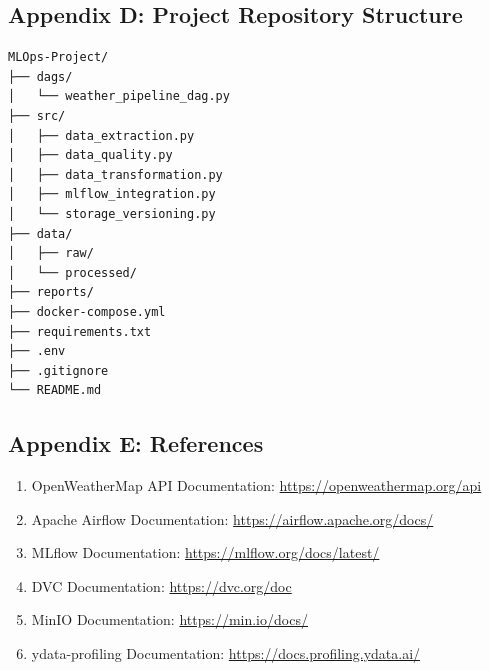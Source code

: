 \documentclass[12pt,a4paper]{article}
\begin{document}
\subsection{Appendix D: Project Repository Structure}

\begin{verbatim}
MLOps-Project/
├── dags/
│   └── weather_pipeline_dag.py
├── src/
│   ├── data_extraction.py
│   ├── data_quality.py
│   ├── data_transformation.py
│   ├── mlflow_integration.py
│   └── storage_versioning.py
├── data/
│   ├── raw/
│   └── processed/
├── reports/
├── docker-compose.yml
├── requirements.txt
├── .env
├── .gitignore
└── README.md
\end{verbatim}

\subsection{Appendix E: References}

\begin{enumerate}
    \item OpenWeatherMap API Documentation: \url{https://openweathermap.org/api}
    \item Apache Airflow Documentation: \url{https://airflow.apache.org/docs/}
    \item MLflow Documentation: \url{https://mlflow.org/docs/latest/}
    \item DVC Documentation: \url{https://dvc.org/doc}
    \item MinIO Documentation: \url{https://min.io/docs/}
    \item ydata-profiling Documentation: \url{https://docs.profiling.ydata.ai/}
\end{enumerate}
\end{document}
